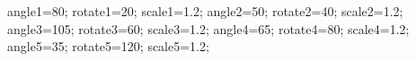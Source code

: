\documentclass[exercice]{thedocument}%
\begin{document}
%
    \>angle1=80;%
    \>rotate1=20;%
    \>scale1=1.2;%
    \>angle2=50;%
    \>rotate2=40;%
    \>scale2=1.2;%
    \>angle3=105;%
    \>rotate3=60;%
    \>scale3=1.2;%
    \>angle4=65;%
    \>rotate4=80;%
    \>scale4=1.2;%
    \>angle5=35;%
    \>rotate5=120;%
    \>scale5=1.2;%
\end{document}
